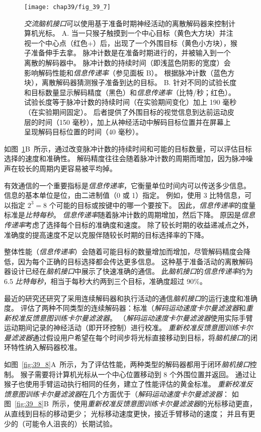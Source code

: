 \begin{figure}[htbp]
	\centering
	\texttt{[image: chap39/fig\_39\_7]}
	\caption{\textit{交流脑机接口}可以使用基于准备时期神经活动的离散解码器来控制计算机光标。 
		A. 当一只猴子触摸到一个中心目标（黄色大方块）并注视一个中心点（红色+）后，出现了一个外围目标（黄色小方块），猴子准备伸手去拿。 
		脉冲计数是在准备时期进行的，并被输入到一个离散的解码器中。 
		脉冲计数的持续时间（即浅蓝色阴影的宽度）会影响解码性能和\textit{信息传递率}（参见面板 B）。 
		根据脉冲计数（蓝色方块），离散解码器猜测猴子准备到达的目标。 
		B. 针对不同的试验长度和目标数量显示解码精度（黑色）和\textit{信息传递率}（比特/秒；红色）。 
		试验长度等于脉冲计数的持续时间（在实验期间变化）加上 190 毫秒（在实验期间固定）。 
		后者提供了外围目标的视觉信息到达前运动皮层的时间（150 毫秒），加上从神经活动中解码目标位置并在屏幕上呈现解码目标位置的时间（40 毫秒）\cite{santhanam2006high}。}
	\label{fig:39_7}
\end{figure}


如图~\ref{fig:39_7}B~所示，通过改变脉冲计数的持续时间和可能的目标数量，可以评估目标选择的速度和准确性。
解码精度往往会随着脉冲计数的周期而增加，因为脉冲噪声在较长的周期内更容易被平均掉。


有效通信的一个重要指标是\textit{信息传递率}，它衡量单位时间内可以传送多少信息。
信息的基本单位是位，由二进制值（0 或 1）指定。
例如，使用 3 比特信息，可以指定 $2^3=8$ 个可能的目标或按键中的哪一个要按下。
因此，\textit{信息传递率}的度量标准是\textit{比特每秒}。
\textit{信息传递率}随着脉冲计数的周期增加，然后下降。
原因是\textit{信息传递率}考虑了选择每个目标的准确度和速度。
除了较长时期的收益递减点之外，准确度的提高速度不足以克服伴随较长时期的目标选择率的下降。


整体性能（\textit{信息传递率}）会随着可能目标的数量增加而增加，尽管解码精度会降低，因为每个正确的目标选择都会传达更多信息。
这种基于准备活动的离散解码器设计已经在\textit{脑机接口}中展示了快速准确的通信。
此\textit{脑机接口}的\textit{信息传递率}约为 6.5 \textit{比特每秒}，相当于每秒大约两到三个目标，准确度超过 90\%。


最近的研究还研究了采用连续解码器和执行活动的通信\textit{脑机接口}的运行速度和准确度。
评估了两种不同类型的连续解码器：标准（\textit{解码运动速度卡尔曼滤波器}和\textit{重新校准反馈意图训练卡尔曼滤波器}。
（\textit{解码运动速度卡尔曼滤波器}使用实际手臂运动期间记录的神经活动（即开环控制）进行校准。
\textit{重新校准反馈意图训练卡尔曼滤波器}通过假设用户希望在每个时间步将光标直接移动到目标，将\textit{脑机接口}的闭环特性纳入解码器校准。


如图~\ref{fig:39_8}A~所示，为了评估性能，两种类型的解码器都用于闭环\textit{脑机接口}控制。
猴子需要将计算机光标从一个中心位置移动到 8 个外围位置并返回。
通过让猴子也使用手臂运动执行相同的任务，建立了性能评估的黄金标准。
\textit{重新校准反馈意图训练卡尔曼滤波器}在几个方面优于（\textit{解码运动速度卡尔曼滤波器}：
如图~\ref{fig:39_8}B~所示，使用\textit{重新校准反馈意图训练卡尔曼滤波器}的光标移动更直，从直线到目标的移动更少；
光标移动速度更快，接近手臂移动的速度；
并且有更少的（可能令人沮丧的）长期试验。


